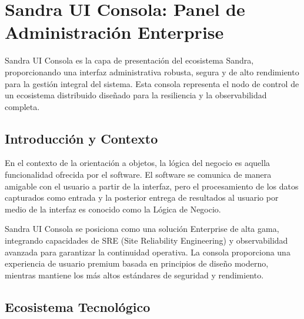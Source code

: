 \chapter{Sandra UI Consola: Panel de Administración Enterprise}

Sandra UI Consola es la capa de presentación del ecosistema Sandra, proporcionando una interfaz administrativa robusta, segura y de alto rendimiento para la gestión integral del sistema. Esta consola representa el nodo de control de un ecosistema distribuido diseñado para la resiliencia y la observabilidad completa.


\section{Introducción y Contexto}

En el contexto de la orientación a objetos, la lógica del negocio es aquella funcionalidad ofrecida por el software. El software se comunica de manera amigable con el usuario a partir de la interfaz, pero el procesamiento de los datos capturados como entrada y la posterior entrega de resultados al usuario por medio de la interfaz es conocido como la Lógica de Negocio.

Sandra UI Consola se posiciona como una solución Enterprise de alta gama, integrando capacidades de SRE (Site Reliability Engineering) y observabilidad avanzada para garantizar la continuidad operativa. La consola proporciona una experiencia de usuario premium basada en principios de diseño moderno, mientras mantiene los más altos estándares de seguridad y rendimiento.


\section{Ecosistema Tecnológico}


